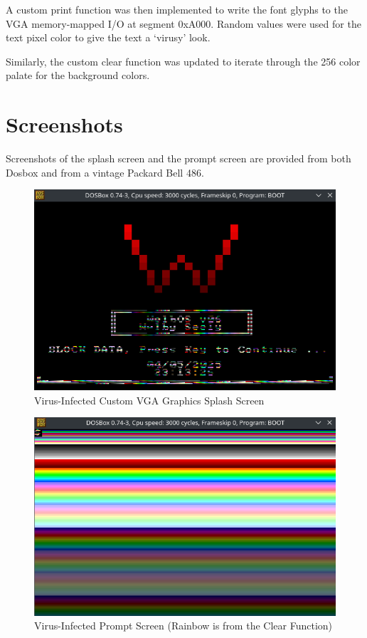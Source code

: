 \documentclass{article}
\begin{document}
    A custom print function was then implemented to write the font glyphs to the VGA memory-mapped I/O at segment 0xA000.
    Random values were used for the text pixel color to give the text a `virusy' look.

    Similarly, the custom clear function was updated to iterate through the 256 color palate for the background colors.

    \section{Screenshots}\label{sec:screenshots}
    Screenshots of the splash screen and the prompt screen are provided from both Dosbox and from a vintage Packard Bell 486.

    \begin{figure}[H]  %
        \centering
        \includegraphics[width=\textwidth]{splash-screen} %
        \caption{Virus-Infected Custom VGA Graphics Splash Screen}
        \label{fig:1}
    \end{figure}

    \begin{figure}[H]  %
        \centering
        \includegraphics[width=\textwidth]{prompt} %
        \caption{Virus-Infected Prompt Screen (Rainbow is from the Clear Function)}
        \label{fig:2}
    \end{figure}
\end{document}
